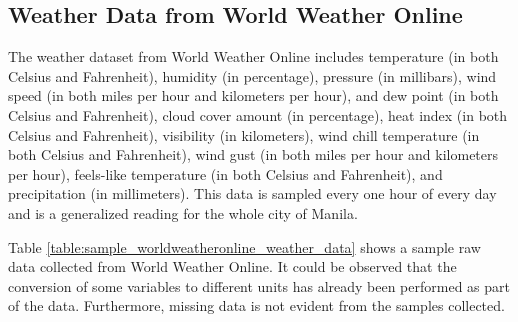 \subsection{Weather Data from World Weather Online}
The weather dataset from World Weather Online includes temperature (in both Celsius and Fahrenheit), humidity (in percentage), pressure (in millibars), wind speed (in both miles per hour and kilometers per hour), and dew point (in both Celsius and Fahrenheit), cloud cover amount (in percentage), heat index (in both Celsius and Fahrenheit), visibility (in kilometers), wind chill temperature (in both Celsius and Fahrenheit), wind gust (in both miles per hour and kilometers per hour), feels-like temperature (in both Celsius and Fahrenheit), and precipitation (in millimeters). This data is sampled every one hour of every day and is a generalized reading for the whole city of Manila.

Table \ref{table:sample_worldweatheronline_weather_data} shows a sample raw data collected from World Weather Online. It could be observed that the conversion of some variables to different units has already been performed as part of the data. Furthermore, missing data is not evident from the samples collected.


